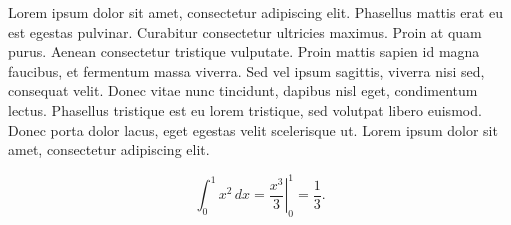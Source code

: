 \documentclass[17pt,oneside]{extbook}
\theoremstyle{mytheorem}
\theoremstyle{myenv}
\begin{document}
\pagestyle{empty}

Lorem ipsum dolor sit amet, consectetur adipiscing elit. Phasellus mattis erat eu est egestas pulvinar. Curabitur consectetur ultricies maximus. Proin at quam purus. Aenean consectetur tristique vulputate. Proin mattis sapien id magna faucibus, et fermentum massa viverra. Sed vel ipsum sagittis, viverra nisi sed, consequat velit. Donec vitae nunc tincidunt, dapibus nisl eget, condimentum lectus. Phasellus tristique est eu lorem tristique, sed volutpat libero euismod. Donec porta dolor lacus, eget egestas velit scelerisque ut. Lorem ipsum dolor sit amet, consectetur adipiscing elit.

\[\int_0^1 x^2 \, dx = \left. \frac{x^3}{3} \right|_0^1 = \frac{1}{3}.\]
\end{document}
